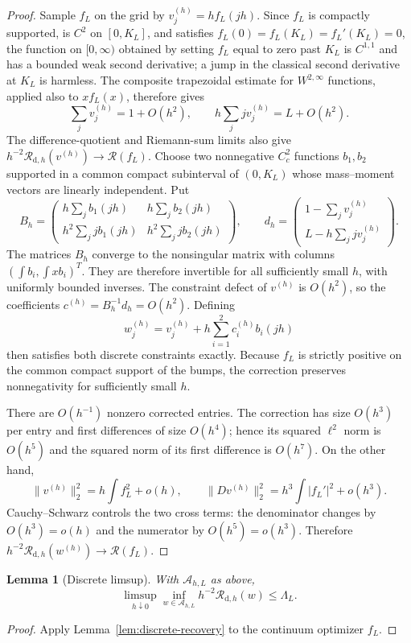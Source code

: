 \documentclass[11pt]{article}
\newtheorem{lemma}[theorem]{Lemma}
\theoremstyle{definition}
\theoremstyle{remark}
\newcommand{\Rcal}{\mathcal R}
\begin{document}
\begin{proof}
Sample $f_L$ on the grid by $v_j^{(h)}=h f_L(jh)$. Since $f_L$ is compactly
supported, is $C^2$ on $[0,K_L]$, and satisfies
$f_L(0)=f_L(K_L)=f_L'(K_L)=0$, the function on $[0,\infty)$ obtained by
setting $f_L$ equal to zero past $K_L$ is $C^{1,1}$ and has a bounded weak
second derivative; a jump in the classical second derivative at $K_L$ is
harmless. The composite trapezoidal estimate for
$W^{2,\infty}$ functions, applied also to $x f_L(x)$, therefore gives
\[
 \sum_jv_j^{(h)}=1+O(h^2),\qquad
 h\sum_jjv_j^{(h)}=L+O(h^2).
\]
The difference-quotient and Riemann-sum limits also give
$h^{-2}\Rcal_{\mathrm d,h}(v^{(h)})\to\Rcal(f_L)$. Choose two nonnegative
$C_c^2$ functions $b_1,b_2$ supported in a common compact subinterval of
$(0,K_L)$ whose mass--moment vectors are linearly independent. Put
\[
 B_h=\begin{pmatrix}
 h\sum_jb_1(jh)&h\sum_jb_2(jh)\\
 h^2\sum_jj b_1(jh)&h^2\sum_jj b_2(jh)
 \end{pmatrix},
 \qquad
 d_h=\begin{pmatrix}
 1-\sum_jv_j^{(h)}\\[2pt]
 L-h\sum_jjv_j^{(h)}
 \end{pmatrix}.
\]
 The matrices $B_h$ converge to the nonsingular matrix with columns
 $(\int b_i,\int xb_i)^T$. They are therefore invertible for all sufficiently
 small $h$, with uniformly bounded inverses. The constraint defect of
 $v^{(h)}$ is $O(h^2)$, so the coefficients
$c^{(h)}=B_h^{-1}d_h=O(h^2)$. Defining
\[
 w_j^{(h)}=v_j^{(h)}+h\sum_{i=1}^2 c_i^{(h)}b_i(jh)
\]
then satisfies both discrete constraints exactly. Because $f_L$ is strictly
positive on the common compact support of the bumps, the correction preserves
nonnegativity for sufficiently small $h$.

There are $O(h^{-1})$ nonzero corrected entries. The correction has size
$O(h^3)$ per entry and first differences of size $O(h^4)$; hence its squared
$\ell^2$ norm is $O(h^5)$ and the squared norm of its first difference is
$O(h^7)$. On the other hand,
\[
 \|v^{(h)}\|_2^2=h\int f_L^2+o(h),
 \qquad
 \|Dv^{(h)}\|_2^2=h^3\int |f_L'|^2+o(h^3).
\]
Cauchy--Schwarz controls the two cross terms: the denominator changes by
$O(h^3)=o(h)$ and the numerator by $O(h^5)=o(h^3)$. Therefore
$h^{-2}\Rcal_{\mathrm d,h}(w^{(h)})\to\Rcal(f_L)$.
\end{proof}

\begin{lemma}[Discrete limsup]\label{lem:discrete-limsup}
With $\mathcal A_{h,L}$ as above,
\[
 \limsup_{h\downarrow0}\inf_{w\in\mathcal A_{h,L}}
 h^{-2}\Rcal_{\mathrm d,h}(w)\leq\Lambda_L.
\]
\end{lemma}
\begin{proof}
Apply Lemma~\ref{lem:discrete-recovery} to the continuum optimizer $f_L$.
\end{proof}
\end{document}
